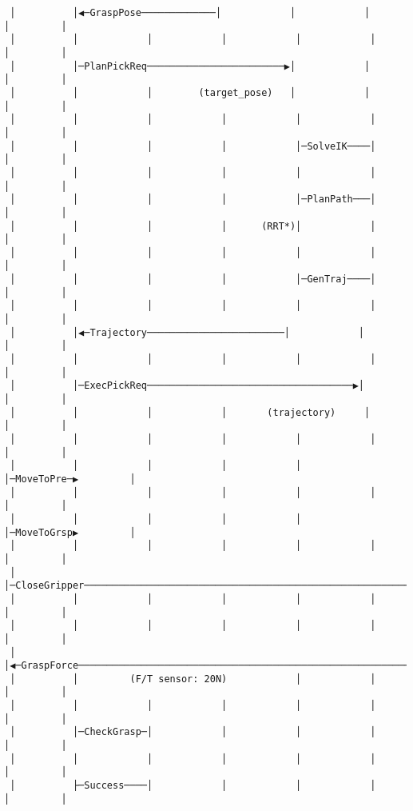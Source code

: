 \documentclass[
]{article}
\begin{document}
\begin{verbatim}
 │          │◀─GraspPose─────────────│            │            │           │         │
 │          │            │            │            │            │           │         │
 │          │─PlanPickReq────────────────────────▶│            │           │         │
 │          │            │        (target_pose)   │            │           │         │
 │          │            │            │            │            │           │         │
 │          │            │            │            │─SolveIK────│           │         │
 │          │            │            │            │            │           │         │
 │          │            │            │            │─PlanPath───│           │         │
 │          │            │            │      (RRT*)│            │           │         │
 │          │            │            │            │            │           │         │
 │          │            │            │            │─GenTraj────│           │         │
 │          │            │            │            │            │           │         │
 │          │◀─Trajectory────────────────────────│            │           │         │
 │          │            │            │            │            │           │         │
 │          │─ExecPickReq────────────────────────────────────▶│           │         │
 │          │            │            │       (trajectory)     │           │         │
 │          │            │            │            │            │           │         │
 │          │            │            │            │            │─MoveToPre─▶         │
 │          │            │            │            │            │           │         │
 │          │            │            │            │            │─MoveToGrsp▶         │
 │          │            │            │            │            │           │         │
 │          │─CloseGripper───────────────────────────────────────────────────────────▶│
 │          │            │            │            │            │           │         │
 │          │            │            │            │            │           │         │
 │          │◀─GraspForce────────────────────────────────────────────────────────────│
 │          │         (F/T sensor: 20N)            │            │           │         │
 │          │            │            │            │            │           │         │
 │          │─CheckGrasp─│            │            │            │           │         │
 │          │            │            │            │            │           │         │
 │          ├─Success────│            │            │            │           │         │

\end{verbatim}
\end{document}
